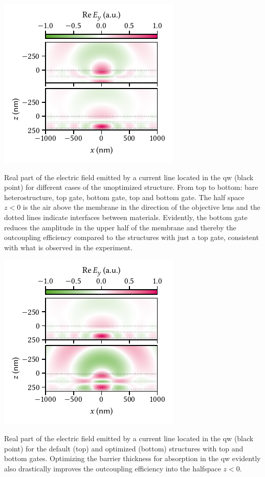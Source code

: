 \begin{marginfigure}
    \centering
    \includegraphics{img/pdf/experiment/tmm_green}
    \caption[]{
        Real part of the electric field emitted by a current line located in the \gls{qw} (black point) for different cases of the unoptimized structure.
        From top to bottom: bare heterostructure, top gate, bottom gate, top and bottom gate.
        The half space $z<0$ is the air above the membrane in the direction of the objective lens and the dotted lines indicate interfaces between materials.
        Evidently, the bottom gate reduces the amplitude in the upper half of the membrane and thereby the outcoupling efficiency compared to the structures with just a top gate, consistent with what is observed in the experiment.
    }
    \label{fig:exp:tmm:green}
\end{marginfigure}

\begin{marginfigure}
    \centering
    \includegraphics{img/pdf/experiment/tmm_green_opt_tgbg}
    \caption[]{
        Real part of the electric field emitted by a current line located in the \gls{qw} (black point) for the default (top) and optimized (bottom) structures with top and bottom gates.
        Optimizing the barrier thickness for absorption in the \gls{qw} evidently also drastically improves the outcoupling efficiency into the halfspace $z<0$.
    }
    \label{fig:exp:tmm:green:opt:tgbg}
\end{marginfigure}
